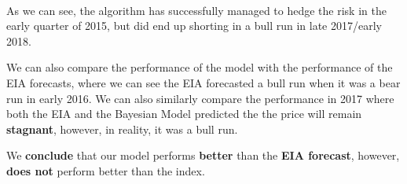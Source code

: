 \documentclass[11pt]{report}
\begin{document}
    \begin{center}
    \end{center}
    { \hspace*{\fill} \\}
    
    As we can see, the algorithm has successfully managed to hedge the risk
in the early quarter of 2015, but did end up shorting in a bull run in
late 2017/early 2018.

We can also compare the performance of the model with the performance of
the EIA forecasts, where we can see the EIA forecasted a bull run when
it was a bear run in early 2016. We can also similarly compare the
performance in 2017 where both the EIA and the Bayesian Model predicted
the the price will remain \textbf{stagnant}, however, in reality, it was
a bull run.

We \textbf{conclude} that our model performs \textbf{better} than the
\textbf{EIA forecast}, however, \textbf{does not} perform better than
the index.


    
    
    
    
\end{document}
